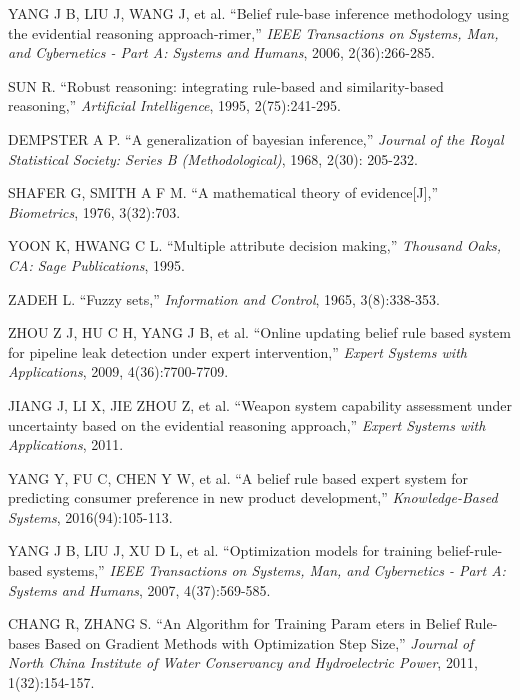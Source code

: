 \documentclass{ieeeaccess}
\begin{document}
\begin{thebibliography}{00}

     YANG J B, LIU J, WANG J, et al. ``Belief rule-base inference methodology
    using the evidential reasoning approach-rimer,''
    \emph{IEEE Transactions on Systems, Man, and Cybernetics - Part A: Systems and Humans},
    2006, 2(36):266-285.

     SUN R. ``Robust reasoning: integrating rule-based and similarity-based
    reasoning,'' \emph{Artificial Intelligence},
    1995, 2(75):241-295.

     DEMPSTER A P. ``A generalization of bayesian inference,''
    \emph{Journal of the Royal Statistical Society: Series B (Methodological)},
    1968, 2(30): 205-232.

     SHAFER G, SMITH A F M. ``A mathematical theory of evidence[J],''
    \emph{Biometrics},
    1976, 3(32):703.

     YOON K, HWANG C L. ``Multiple attribute decision making,''
    \emph{Thousand Oaks, CA: Sage Publications},
    1995.

     ZADEH L. ``Fuzzy sets,''
    \emph{Information and Control},
    1965, 3(8):338-353.

     ZHOU Z J, HU C H, YANG J B, et al. ``Online updating belief rule based
    system for pipeline leak detection under expert intervention,''
    \emph{Expert Systems with Applications},
    2009, 4(36):7700-7709.

     JIANG J, LI X, JIE ZHOU Z, et al. ``Weapon system capability assessment
    under uncertainty based on the evidential reasoning approach,''
    \emph{Expert Systems with Applications},
    2011.

     YANG Y, FU C, CHEN Y W, et al. ``A belief rule based expert system
    for predicting consumer preference in new product development,''
    \emph{Knowledge-Based Systems},
    2016(94):105-113.

     YANG J B, LIU J, XU D L, et al. ``Optimization models for training
    belief-rule-based systems,''
    \emph{IEEE Transactions on Systems, Man, and Cybernetics - Part A: Systems and Humans},
    2007, 4(37):569-585.

     CHANG R, ZHANG S. ``An Algorithm for Training Param eters in Belief Rule-bases Based on
    Gradient Methods with Optimization Step Size,''
    \emph{Journal of North China Institute of Water Conservancy and Hydroelectric Power},
    2011, 1(32):154-157.


\end{thebibliography}
\end{document}
